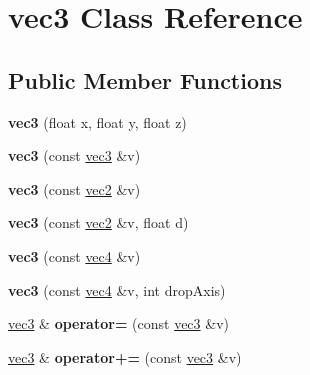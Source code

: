 \hypertarget{classvec3}{\section{vec3 Class Reference}
\label{classvec3}
}
\subsection*{Public Member Functions}
\begin{DoxyCompactItemize}
\item 
\hypertarget{classvec3_a0c11a1f6ed4c349713657dd3452d6ea3}{{\bfseries vec3} (float x, float y, float z)}\label{classvec3_a0c11a1f6ed4c349713657dd3452d6ea3}

\item 
\hypertarget{classvec3_a06ea320dd131518426173209e2e9a709}{{\bfseries vec3} (const \hyperlink{classvec3}{vec3} \&v)}\label{classvec3_a06ea320dd131518426173209e2e9a709}

\item 
\hypertarget{classvec3_a73e6bbf289ab4471ceed730a96717c62}{{\bfseries vec3} (const \hyperlink{classvec2}{vec2} \&v)}\label{classvec3_a73e6bbf289ab4471ceed730a96717c62}

\item 
\hypertarget{classvec3_a55469e9d0529d99c0073d2087d65b821}{{\bfseries vec3} (const \hyperlink{classvec2}{vec2} \&v, float d)}\label{classvec3_a55469e9d0529d99c0073d2087d65b821}

\item 
\hypertarget{classvec3_a050ae8cd5cff270b8e3fb4d3174dec78}{{\bfseries vec3} (const \hyperlink{classvec4}{vec4} \&v)}\label{classvec3_a050ae8cd5cff270b8e3fb4d3174dec78}

\item 
\hypertarget{classvec3_a61bb2f9fa43759186053f54c2c5b90cb}{{\bfseries vec3} (const \hyperlink{classvec4}{vec4} \&v, int drop\-Axis)}\label{classvec3_a61bb2f9fa43759186053f54c2c5b90cb}

\item 
\hypertarget{classvec3_a346036974a237bbe1aba74f2219486e7}{\hyperlink{classvec3}{vec3} \& {\bfseries operator=} (const \hyperlink{classvec3}{vec3} \&v)}\label{classvec3_a346036974a237bbe1aba74f2219486e7}

\item 
\hypertarget{classvec3_a614d7b802426ae5d50236e339a47cc16}{\hyperlink{classvec3}{vec3} \& {\bfseries operator+=} (const \hyperlink{classvec3}{vec3} \&v)}\label{classvec3_a614d7b802426ae5d50236e339a47cc16}


\end{DoxyCompactItemize}
